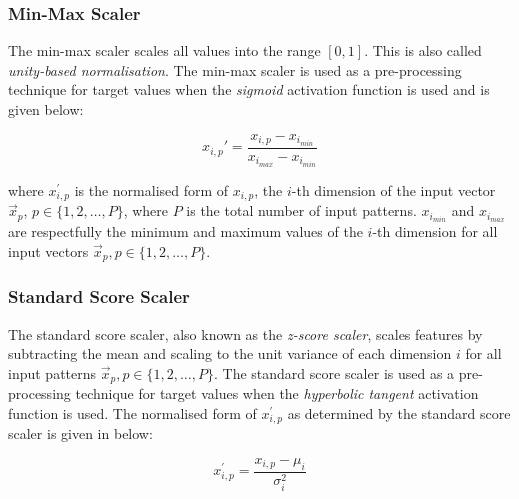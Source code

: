 \subsubsection{Min-Max Scaler}
\label{sec:anns:an:input:min_max_scaler}

The min-max scaler scales all values into the range
$[0,1]$. This is also called \textit{unity-based normalisation}. The
min-max scaler is used as a pre-processing technique for
target values when the \textit{sigmoid}  activation function is used and is given below:

\begin{equation}
    x_{i,p}'  = \frac{x_{i,p} - x_{i_{min}}}{x_{i_{max}} - x_{i_{min}}}
    \label{eq:min_max_scaler}
\end{equation}

\noindent where $x_{i,p}^{'}$ is the normalised form of $x_{i,p}$, the $i$-th
dimension of the input vector $\vec{x}_p$, $p \in \{1,2, \dots, P \}$, where $P$
is the total number of input patterns. $x_{i_{min}}$ and $x_{i_{max}}$ are
respectfully the minimum and maximum values of the $i$-th dimension for all
input vectors $\vec{x}_p, p \in \{1,2, \dots, P\}$.

\subsubsection{Standard Score Scaler}
\label{sec:anns:an:input:standard_score_scaler}

The standard score scaler, also known as the
\textit{z-score scaler}, scales features by subtracting
the mean and scaling to the unit variance of each dimension $i$ for all input
patterns $\vec{x}_p, p \in \{1,2, \dots, P\}$. The standard score scaler is used as a pre-processing technique for target
values when the \textit{hyperbolic tangent}
activation function is
used. The normalised form of $x_{i,p}^{'}$ as determined by the standard score scaler is given in below: 

\begin{equation}
    x_{i,p}^{'} = \frac{x_{i,p} - \mu_i}{\sigma^2_i}
    \label{eq:standard_score_scaler}
\end{equation}

